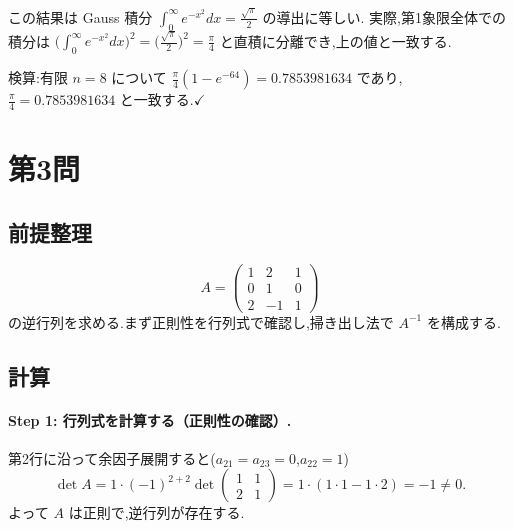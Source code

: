 \documentclass[11pt,a4paper]{article}
\begin{document}
\begin{rem}
この結果は Gauss 積分 $\int_0^\infty e^{-x^2}dx=\frac{\sqrt\pi}{2}$ の導出に等しい.
実際,第1象限全体での積分は
$\bigl(\int_0^\infty e^{-x^2}dx\bigr)^2=\bigl(\frac{\sqrt\pi}{2}\bigr)^2=\frac{\pi}{4}$
と直積に分離でき,上の値と一致する.
\end{rem}

検算:有限 $n=8$ について $\frac{\pi}{4}(1-e^{-64})=0.7853981634$ であり,
$\frac{\pi}{4}=0.7853981634$ と一致する.$\checkmark$

\section*{第3問}

\subsection*{前提整理}

\[
A=\begin{pmatrix}1&2&1\\0&1&0\\2&-1&1\end{pmatrix}
\]
の逆行列を求める.まず正則性を行列式で確認し,掃き出し法で $A^{-1}$ を構成する.

\subsection*{計算}

\paragraph{Step 1: 行列式を計算する（正則性の確認）.}
第2行に沿って余因子展開すると($a_{21}=a_{23}=0$,$a_{22}=1$)
\[
\det A=1\cdot(-1)^{2+2}\det\begin{pmatrix}1&1\\2&1\end{pmatrix}
=1\cdot(1\cdot1-1\cdot2)=-1\neq0.
\]
よって $A$ は正則で,逆行列が存在する.
\end{document}
